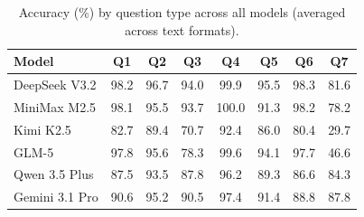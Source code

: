\documentclass[11pt]{article}
\begin{document}
\begin{table}[t]
\centering
\small
\begin{tabular}{lccccccc}
\toprule
\textbf{Model} & \textbf{Q1} & \textbf{Q2} & \textbf{Q3} & \textbf{Q4} & \textbf{Q5} & \textbf{Q6} & \textbf{Q7} \\
\midrule
DeepSeek V3.2 & 98.2 & 96.7 & 94.0 & 99.9 & 95.5 & 98.3 & 81.6 \\
MiniMax M2.5 & 98.1 & 95.5 & 93.7 & 100.0 & 91.3 & 98.2 & 78.2 \\
Kimi K2.5 & 82.7 & 89.4 & 70.7 & 92.4 & 86.0 & 80.4 & 29.7 \\
GLM-5 & 97.8 & 95.6 & 78.3 & 99.6 & 94.1 & 97.7 & 46.6 \\
Qwen 3.5 Plus & 87.5 & 93.5 & 87.8 & 96.2 & 89.3 & 86.6 & 84.3 \\
Gemini 3.1 Pro & 90.6 & 95.2 & 90.5 & 97.4 & 91.4 & 88.8 & 87.8 \\
\bottomrule
\end{tabular}
\caption{Accuracy (\%) by question type across all models (averaged across text formats).}
\label{tab:qtype_full}
\end{table}
\end{document}
